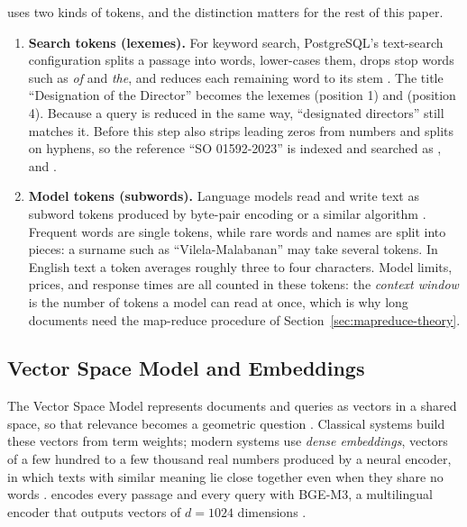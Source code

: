\cs{} uses two kinds of tokens, and the distinction matters for the rest of this paper.

\begin{enumerate}
  \item \textbf{Search tokens (lexemes).} For keyword search, PostgreSQL's  text-search configuration splits a passage into words, lower-cases them, drops stop words such as \emph{of} and \emph{the}, and reduces each remaining word to its stem \citep{postgres2024fts}. The title ``Designation of the Director'' becomes the lexemes  (position 1) and  (position 4). Because a query is reduced in the same way, ``designated directors'' still matches it. Before this step \cs{} also strips leading zeros from numbers and splits on hyphens, so the reference ``SO 01592-2023'' is indexed and searched as ,  and .
  \item \textbf{Model tokens (subwords).} Language models read and write text as subword tokens produced by byte-pair encoding or a similar algorithm \citep{sennrich2016bpe,kudo2018sentencepiece}. Frequent words are single tokens, while rare words and names are split into pieces: a surname such as ``Vilela-Malabanan'' may take several tokens. In English text a token averages roughly three to four characters. Model limits, prices, and response times are all counted in these tokens: the \emph{context window} is the number of tokens a model can read at once, which is why long documents need the map-reduce procedure of Section~\ref{sec:mapreduce-theory}.
\end{enumerate}

\subsection{Vector Space Model and Embeddings}\label{sec:vsm}

The Vector Space Model represents documents and queries as vectors in a shared space, so that relevance becomes a geometric question \citep{salton1975vsm}. Classical systems build these vectors from term weights; modern systems use \emph{dense embeddings}, vectors of a few hundred to a few thousand real numbers produced by a neural encoder, in which texts with similar meaning lie close together even when they share no words \citep{mikolov2013,devlin2019}. \cs{} encodes every passage and every query with BGE-M3, a multilingual encoder that outputs vectors of $d = 1024$ dimensions \citep{chen2024bgem3}.

